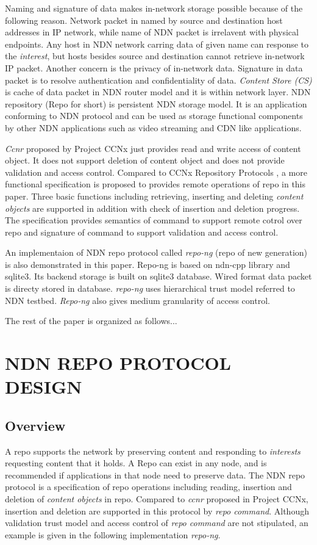 \documentclass{acm_proc_article-sp}
\begin{document}
Naming and signature of data makes in-network storage possible because of the following reason. Network packet in named by source and destination host addresses in IP network, while name of NDN packet is irrelavent with physical endpoints. Any host in NDN network carring data of given name can response to the \emph{interest}, but hosts besides source and destination cannot retrieve in-network IP packet. Another concern is the privacy of in-network data. Signature in data packet is to resolve authentication and confidentiality of data. \emph{Content Store (CS)} is cache of data packet in NDN router model and it is within network layer. NDN repository (Repo for short) is persistent NDN storage model. It is an application conforming to NDN protocol and can be used as storage functional components by other NDN applications such as video streaming and CDN like applications.

\emph{Ccnr} proposed by Project CCNx just provides read and write access of content object. It does not support deletion of content object and does not provide validation and access control. Compared to CCNx Repository Protocols \cite{ccnr}, a more functional specification is proposed to provides remote operations of repo in this paper. Three basic functions including retrieving, inserting and deleting \emph{content objects} are supported in addition with check of insertion and deletion progress. The specification provides semantics of command to support remote cotrol over repo and signature of command to support validation and access control.

An implementaion of NDN repo protocol called \emph{repo-ng} (repo of new generation) is also demonstrated in this paper. Repo-ng is based on ndn-cpp library and sqlite3. Its backend storage is built on sqlite3 database. Wired format data packet is directy stored in database. \emph{repo-ng} uses hierarchical trust model referred to NDN testbed. \cite{ndn-key} \emph{Repo-ng} also gives medium granularity of access control.

The rest of the paper is organized as follows...

\section{NDN REPO PROTOCOL DESIGN}
\subsection{Overview}
A repo supports the network by preserving content and responding to \emph{interests} requesting content that it holds. A Repo can exist in any node, and is recommended if applications in that node need to preserve data. The NDN repo protocol is a specification of repo operations including reading, insertion and deletion of \emph{content objects} in repo. Compared to \emph{ccnr} proposed in Project CCNx, insertion and deletion are supported in this protocol by \emph{repo command}. Although validation trust model and access control of \emph{repo command} are not stipulated, an example is given in the following implementation \emph{repo-ng}.
\end{document}
